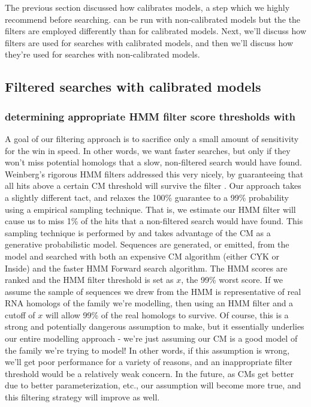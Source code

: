The previous section discussed how  calibrates
models, a step which we highly recommend before searching.
 can be run with non-calibrated models but the the
filters are employed differently than for calibrated models.  Next,
we'll discuss how filters are used for searches with calibrated
models, and then we'll discuss how they're used for searches with
non-calibrated models.

\subsection{Filtered searches with calibrated models}

\subsubsection{determining appropriate HMM filter score thresholds with }
A goal of our filtering approach is to sacrifice only a small amount
of sensitivity for the win in speed. In other words, we want faster
searches, but only if they won't miss potential homologs that a slow,
non-filtered search would have found.  Weinberg's rigorous HMM filters
addressed this very nicely, by guaranteeing that all hits above a
certain CM threshold will survive the filter
\cite{WeinbergRuzzo04}. Our approach takes a slightly different tact,
and relaxes the 100\% guarantee to a 99\% probability using a
empirical sampling technique. That is, we estimate our HMM filter will
cause us to miss 1\% of the hits that a non-filtered search would have
found. This sampling technique is performed by  and
takes advantage of the CM as a generative probabilistic model.
Sequences are generated, or emitted, from the model and searched with
both an expensive CM algorithm (either CYK or Inside) and the faster
HMM Forward search algorithm. The HMM scores are ranked and the HMM
filter threshold is set as $x$, the 99\% worst score. If we assume
the sample of sequences we drew from the HMM is representative of real
RNA homologs of the family we're modelling, then using an HMM filter
and a cutoff of $x$ will allow 99\% of the real homologs to
survive. Of course, this is a strong and potentially dangerous
assumption to make, but it essentially underlies our entire modelling
approach - we're just assuming our CM is a good model of the family
we're trying to model!  In other words, if this assumption is wrong,
we'll get poor performance for a variety of reasons, and an
inappropriate filter threshold would be a relatively weak concern.  In
the future, as CMs get better due to better parameterization, etc.,
our assumption will become more true, and this filtering strategy will
improve as well. 

